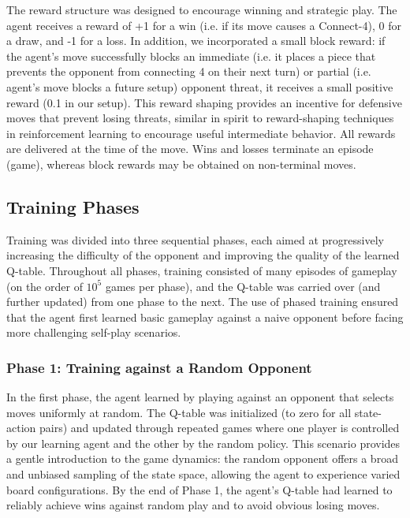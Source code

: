 \documentclass[10pt]{extarticle}
\begin{document}
The reward structure was designed to encourage winning and strategic play. The agent receives a reward of +1 for a win (i.e. if its move causes a Connect-4), 0 for a draw, and -1 for a loss. In addition, we incorporated a small block reward: if the agent's move successfully blocks an immediate (i.e. it places a piece that prevents the opponent from connecting 4 on their next turn) or partial (i.e. agent's move blocks a future setup) opponent threat, it receives a small positive reward (0.1 in our setup). This reward shaping provides an incentive for defensive moves that prevent losing threats, similar in spirit to reward-shaping techniques in reinforcement learning to encourage useful intermediate behavior. All rewards are delivered at the time of the move. Wins and losses terminate an episode (game), whereas block rewards may be obtained on non-terminal moves.

\subsection{Training Phases}

Training was divided into three sequential phases, each aimed at progressively increasing the difficulty of the opponent and improving the quality of the learned Q-table. Throughout all phases, training consisted of many episodes of gameplay (on the order of $10^5$ games per phase), and the Q-table was carried over (and further updated) from one phase to the next. The use of phased training ensured that the agent first learned basic gameplay against a naive opponent before facing more challenging self-play scenarios.

\subsubsection{Phase 1: Training against a Random Opponent}

In the first phase, the agent learned by playing against an opponent that selects moves uniformly at random. The Q-table was initialized (to zero for all state-action pairs) and updated through repeated games where one player is controlled by our learning agent and the other by the random policy. This scenario provides a gentle introduction to the game dynamics: the random opponent offers a broad and unbiased sampling of the state space, allowing the agent to experience varied board configurations. By the end of Phase 1, the agent's Q-table had learned to reliably achieve wins against random play and to avoid obvious losing moves. 
\end{document}

